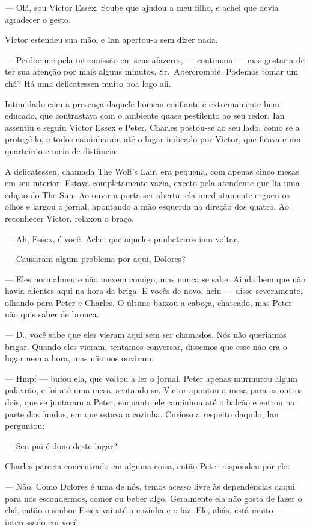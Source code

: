 --- Olá, sou Victor Essex. Soube que ajudou a meu filho, e achei que devia
agradecer o gesto.

Victor estendeu sua mão, e Ian apertou-a sem dizer nada.

--- Perdoe-me pela intromissão em seus afazeres, --- continuou --- mas gostaria
de ter sua atenção por mais alguns minutos, Sr.~Abercrombie. Podemos tomar um
chá? Há uma delicatessen muito boa logo ali.

Intimidado com a presença daquele homem confiante e extremamente bem-educado,
que contrastava com o ambiente quase pestilento ao seu redor, Ian assentiu e
seguiu Victor Essex e Peter. Charles postou-se ao seu lado, como se a
protegê-lo, e todos caminharam até o lugar indicado por Victor, que ficava e um
quarteirão e meio de distância.

A delicatessen, chamada The Wolf’s Lair, era pequena, com apenas cinco mesas em
seu interior. Estava completamente vazia, exceto pela atendente que lia uma
edição do The Sun. Ao ouvir a porta ser aberta, ela imediatamente ergueu os
olhos e largou o jornal, apontando a mão esquerda na direção dos quatro. Ao
reconhecer Victor, relaxou o braço.

--- Ah, Essex, é você. Achei que aqueles punheteiros iam voltar.

--- Causaram algum problema por aqui, Dolores?

--- Eles normalmente não mexem comigo, mas nunca se sabe. Ainda bem que não
havia clientes aqui na hora da briga. E vocês de novo, hein --- disse
severamente, olhando para Peter e Charles. O último baixou a cabeça, chateado,
mas Peter não quis saber de bronca.

--- D., você sabe que eles vieram aqui sem ser chamados. Nós não queríamos
brigar. Quando eles vieram, tentamos conversar, dissemos que esse não era o
lugar nem a hora, mas não nos ouviram.

--- Hmpf --- bufou ela, que voltou a ler o jornal. Peter apenas murmurou algum
palavrão, e foi até uma mesa, sentando-se. Victor apontou a mesa para os outros
dois, que se juntaram a Peter, enquanto ele caminhou até o balcão e entrou na
parte dos fundos, em que estava a cozinha. Curioso a respeito daquilo, Ian
perguntou:

--- Seu pai é dono deste lugar?

Charles parecia concentrado em alguma coisa, então Peter respondeu por ele:

--- Não. Como Dolores é uma de nós, temos acesso livre às dependências daqui
para nos escondermos, comer ou beber algo. Geralmente ela não gosta de fazer o
chá, então o senhor Essex vai até a cozinha e o faz. Ele, aliás, está muito
interessado em você.

